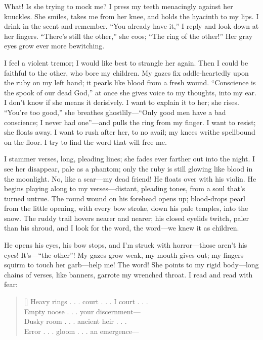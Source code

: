\documentclass[12pt,a4paper]{article}
\begin{document}
What! Is she trying to mock me? I press my teeth menacingly against her knuckles. She smiles, takes me from her knee, and holds the hyacinth to my lips. I drink in the scent and remember. “You already have it,” I reply and look down at her fingers. “There’s still the other,” she coos; “The ring of the other!” Her gray eyes grow ever more bewitching.

I feel a violent tremor; I would like best to strangle her again. Then I could be faithful to the other, who bore my children. My gazes fix addle-heartedly upon the ruby on my left hand; it pearls like blood from a fresh wound. “Conscience is the spook of our dead God,” at once she gives voice to my thoughts, into my ear. I don’t know if she means it derisively. I want to explain it to her; she rises. “You’re too good,” she breathes ghostlily—“Only good men have a bad conscience; I never had one”—and pulls the ring from my finger. I want to resist; she floats away. I want to rush after her, to no avail; my knees writhe spellbound on the floor. I try to find the word that will free me.

I stammer verses, long, pleading lines; she fades ever farther out into the night. I see her disappear, pale as a phantom; only the ruby is still glowing like blood in the moonlight. No, like a scar—my dead friend! He floats over with his violin. He begins playing along to my verses—distant, pleading tones, from a soul that’s turned untrue. The round wound on his forehead opens up; blood-drops pearl from the little opening, with every bow stroke, down his pale temples, into the snow. The ruddy trail hovers nearer and nearer; his closed eyelids twitch, paler than his shroud, and I look for the word, the word—we knew it as children.

He opens his eyes, his bow stops, and I’m struck with horror—those aren’t his eyes! It’s—“the other”! My gazes grow weak, my mouth gives out; my fingers squirm to touch her garb—help me! The word! She points to my rigid body—long chains of verses, like banners, garrote my wrenched throat. I read and read with fear:
\settowidth{\versewidth}{Empty noose . . . your discernment—}
\begin{verse}[\versewidth]
Heavy rings . . . court . . . I court . . . \\
Empty noose . . . your discernment— \\
Dusky room . . . ancient heir . . . \\
Error . . . gloom . . . an emergence— 
\end{verse}
\end{document}
